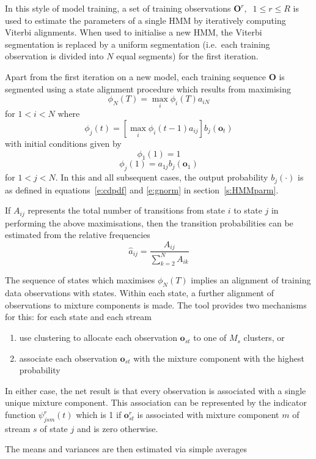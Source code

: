 In this style of model training, a set of training observations
$\bm{O}^r, \;\; 1 \leq r \leq R$ is used to estimate the 
parameters of a single HMM by iteratively computing Viterbi alignments.
When used to initialise a new HMM, the Viterbi segmentation is
replaced by a uniform segmentation (i.e.\ each training
observation is divided into $N$ equal segments) 
for the first iteration.

Apart from the first iteration on a new model, 
each training sequence $\bm{O}$ is segmented using a state alignment procedure
which results from maximising
\[
    \phi_N(T) = \max_i \phi_i(T) a_{iN}
\]
for $1<i<N$ where
\[
  \phi_j(t) = \left[ \max_i \phi_i(t-1) a_{ij} \right] b_j(\bm{o}_t)
\]
with initial conditions given by 
\[
    \phi_1(1) = 1
\]
\[
    \phi_j(1) = a_{1j} b_j(\bm{o}_1)
\]
for $1<j<N$. 
In this and all subsequent cases, the output  probability $b_j(\cdot)$ is as defined in
equations~\ref{e:cdpdf} and \ref{e:gnorm} in section~\ref{s:HMMparm}.

If $A_{ij}$ represents the total number of transitions from state $i$ to state $j$
in performing the above maximisations, then the transition probabilities can
be estimated from the relative frequencies
\[
  \hat{a}_{ij} = \frac{A_{ij}}{\sum_{k=2}^{N}A_{ik}}
\]

The sequence of states which maximises $\phi_N(T)$ implies an alignment of
training data observations with states.  Within each state, a further alignment
of observations to mixture components is made.  The tool  provides
two mechanisms for this:  for each state and each stream
\begin{enumerate}
\item use clustering to allocate each observation $\bm{o}_{st}$ to one of $M_s$ clusters, or
\item associate each observation $\bm{o}_{st}$ with the mixture component with the
       highest probability
\end{enumerate}
In either case, the net result is that every observation is associated with a single
unique mixture component.  This association can be
represented by the indicator function $\psi^r_{jsm}(t)$ which is 1
if $\bm{o}^r_{st}$ is associated with mixture component $m$ of stream $s$ of 
state $j$ and is zero otherwise.

The means and variances are then estimated via simple averages
\newcommand{\vitsum}[2]{
                  \sum_{r=1}^R  \sum_{t=1}^{T_r} #1 \psi^r_{js#2}(t)
}

